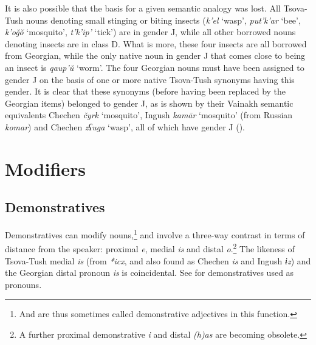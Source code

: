It is also possible that the basis for a given semantic analogy was lost. All Tsova-Tush nouns denoting small stinging or biting insects (\textit{k'el} `wasp’, \textit{put'k'ar} `bee’, \textit{k'o\u{g}\u{o}} `mosquito’, \textit{t'k'ip'} `tick’) are in gender J, while all other borrowed nouns denoting insects are in class D. What is more, these four insects are all borrowed from Georgian, while the only native noun in gender J that comes close to being an insect is \textit{qaup'\u{u}} `worm’. The four Georgian nouns must have been assigned to gender J on the basis of one or more native Tsova-Tush synonyms having this gender. It is clear that these synonyms (before having been replaced by the Georgian items) belonged to gender J, as is shown by their Vainakh semantic equivalents Chechen \textit{čyrk} `mosquito’, Ingush \textit{kamār} `mosquito’ (from Russian \textit{komar}) and Chechen \textit{zʕuga} `wasp’, all of which have gender J (\cite{matsiev61dict}). 



\section{Modifiers} \label{modifiers}

\subsection{Demonstratives} \label{demonstratives}

Demonstratives can modify nouns,\footnote{And are thus sometimes called demonstrative adjectives in this function.} and involve a three-way contrast in terms of distance from the speaker: proximal \textit{e}, medial \textit{is} and distal \textit{o}.\footnote{A further proximal demonstrative \textit{i} and distal \textit{(h)as} are becoming obsolete.} The likeness of Tsova-Tush medial \textit{is} (from \textit{*icx}, and also found as Chechen \textit{is} and Ingush \textit{ɨz}) and the Georgian distal pronoun \textit{is} is coincidental. See  for demonstratives used as pronouns.

